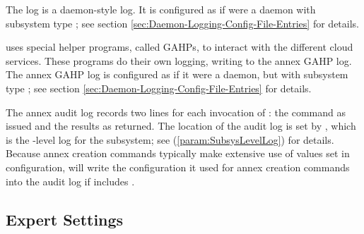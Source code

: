 The  log is a daemon-style log.  It is configured as if
 were a daemon with subsystem type ;
see section \ref{sec:Daemon-Logging-Config-File-Entries} for details.

 uses special helper programs, called GAHPs, to interact
with the different cloud services.  These programs do their own logging,
writing to the annex GAHP log.  The annex GAHP log is configured as if it
were a daemon, but with subsystem type ; see section
\ref{sec:Daemon-Logging-Config-File-Entries} for details.

The annex audit log records two lines for each invocation of :
the command as issued and the results as returned.  The location of the
audit log is set by , which is the
-level log for the  subsystem; see
 (\ref{param:SubsysLevelLog}) for details.
Because annex creation commands typically make extensive use of values set
in configuration,  will write the configuration it used for
annex creation commands into the audit log if  includes
.

\subsection{\label{sec:clouds-config-experts}Expert Settings}

